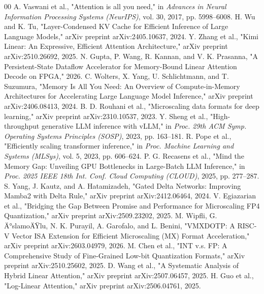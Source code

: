 ﻿\documentclass[conference]{IEEEtran}
\begin{document}
\begin{thebibliography}{00}
 A. Vaswani et al., "Attention is all you need," in \textit{Advances in Neural Information Processing Systems (NeurIPS)}, vol. 30, 2017, pp. 5998--6008.
 H. Wu and K. Tu, "Layer-Condensed KV Cache for Efficient Inference of Large Language Models," arXiv preprint arXiv:2405.10637, 2024.
 Y. Zhang et al., "Kimi Linear: An Expressive, Efficient Attention Architecture," arXiv preprint arXiv:2510.26692, 2025.
 N. Gupta, P. Wang, R. Kannan, and V. K. Prasanna, "A Persistent-State Dataflow Accelerator for Memory-Bound Linear Attention Decode on FPGA," 2026.
 C. Wolters, X. Yang, U. Schlichtmann, and T. Suzumura, "Memory Is All You Need: An Overview of Compute-in-Memory Architectures for Accelerating Large Language Model Inference," arXiv preprint arXiv:2406.08413, 2024.
 B. D. Rouhani et al., "Microscaling data formats for deep learning," arXiv preprint arXiv:2310.10537, 2023.
 Y. Sheng et al., "High-throughput generative LLM inference with vLLM," in \textit{Proc. 29th ACM Symp. Operating Systems Principles (SOSP)}, 2023, pp. 163--181.
 R. Pope et al., "Efficiently scaling transformer inference," in \textit{Proc. Machine Learning and Systems (MLSys)}, vol. 5, 2023, pp. 606--624.
 P. G. Recasens et al., "Mind the Memory Gap: Unveiling GPU Bottlenecks in Large-Batch LLM Inference," in \textit{Proc. 2025 IEEE 18th Int. Conf. Cloud Computing (CLOUD)}, 2025, pp. 277--287.
 S. Yang, J. Kautz, and A. Hatamizadeh, "Gated Delta Networks: Improving Mamba2 with Delta Rule," arXiv preprint arXiv:2412.06464, 2024.
 V. Egiazarian et al., "Bridging the Gap Between Promise and Performance for Microscaling FP4 Quantization," arXiv preprint arXiv:2509.23202, 2025.
 M. Wipfli, G. Ä°slamoÄŸlu, N. K. Purayil, A. Garofalo, and L. Benini, "VMXDOTP: A RISC-V Vector ISA Extension for Efficient Microscaling (MX) Format Acceleration," arXiv preprint arXiv:2603.04979, 2026.
 M. Chen et al., "INT v.s. FP: A Comprehensive Study of Fine-Grained Low-bit Quantization Formats," arXiv preprint arXiv:2510.25602, 2025.
 D. Wang et al., "A Systematic Analysis of Hybrid Linear Attention," arXiv preprint arXiv:2507.06457, 2025.
 H. Guo et al., "Log-Linear Attention," arXiv preprint arXiv:2506.04761, 2025.
\end{thebibliography}
\end{document}
